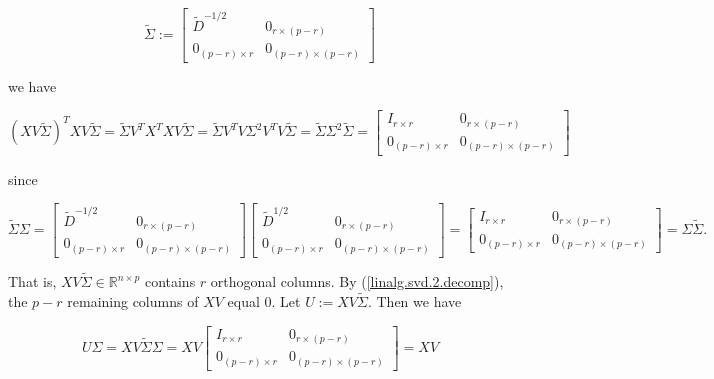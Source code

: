 \[
\tilde{\Sigma} :=  \begin{bmatrix} 
\tilde{D}^{-1/2} & 0_{r \times (p - r)} \\
0_{(p-r) \times r}  & 0_{(p-r) \times (p-r)}
\end{bmatrix}
\]

we have 


\begin{equation}\label{linalg.svd.3.decomp}
(XV \tilde{\Sigma})^T XV \tilde{\Sigma} =  \tilde{\Sigma} V^T X^TXV \tilde{\Sigma} = \tilde{\Sigma}  V^T V \Sigma^2 V^TV \tilde{\Sigma} = \tilde{\Sigma} \Sigma^2 \tilde{\Sigma} =  \begin{bmatrix} 
I_{r \times r} & 0_{r \times (p - r)} \\
0_{(p-r) \times r}  & 0_{(p-r) \times (p-r)}
\end{bmatrix} 
\end{equation}

since

\[
\tilde{\Sigma} \Sigma =  \begin{bmatrix} 
\tilde{D}^{-1/2} & 0_{r \times (p - r)} \\
0_{(p-r) \times r}  & 0_{(p-r) \times (p-r)}
\end{bmatrix} \begin{bmatrix} 
\tilde{D}^{1/2} & 0_{r \times (p - r)} \\
0_{(p-r) \times r}  & 0_{(p-r) \times (p-r)}
\end{bmatrix} = 
 \begin{bmatrix} 
I_{r \times r} & 0_{r \times (p - r)} \\
0_{(p-r) \times r}  & 0_{(p-r) \times (p-r)}
\end{bmatrix} =  \Sigma \tilde{\Sigma} .
\]

That is, \(XV \tilde{\Sigma} \in \mathbb{R}^{n \times p}\) contains \(r\) orthogonal columns. By (\ref{linalg.svd.2.decomp}), the \(p - r\) remaining columns of \(XV\) equal 0. Let \(U := XV \tilde{\Sigma}\). Then we have

\begin{equation}\label{linalg.svd.4.decomp}
U \Sigma = XV \tilde{\Sigma} \Sigma = XV  \begin{bmatrix} 
I_{r \times r} & 0_{r \times (p - r)} \\
0_{(p-r) \times r}  & 0_{(p-r) \times (p-r)}
\end{bmatrix} = XV
\end{equation}

